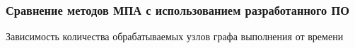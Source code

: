 \documentclass[hyperref={pdfpagelabels=false},10pt,gray]{beamer}
\begin{document}
\begin{frame}
\frametitle{Сравнение методов МПА с использованием разработанного ПО}
Зависимость количества обрабатываемых узлов графа выполнения от времени
\begin{figure}[h]
  \begin{minipage}[h]{0.49\linewidth}
  \end{minipage}
  \hfill
  \begin{minipage}[h]{0.49\linewidth}
  \end{minipage}
\end{figure}
\end{frame}
\end{document}
